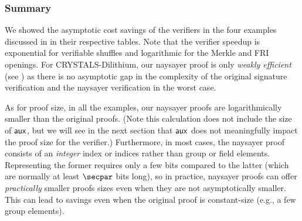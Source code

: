 \subsubsection{Summary}

% 

We showed the asymptotic cost savings of the verifiers in the four examples discussed in  in their respective tables. Note that the verifier speedup is exponential for verifiable shuffles and logarithmic for the Merkle and FRI openings. For CRYSTALS-Dilithium, our naysayer proof is only \emph{weakly efficient} (see ) as there is no asymptotic gap in the complexity of the original signature verification and the naysayer verification in the worst case.

As for proof size, in all the examples, our naysayer proofs are logarithmically smaller than the original proofs.
(Note this calculation does not include the size of $\mathsf{aux}$, but we will see in the next section that $\mathsf{aux}$ does not meaningfully impact the proof size for the verifier.)
Furthermore, in most cases, the naysayer proof consists of an \emph{integer} index or indices rather than group or field elements. Representing the former requires only a few bits compared to the latter (which are normally at least $\secpar$ bits long), so in practice, naysayer proofs can offer \emph{practically} smaller proofs sizes even when they are not asymptotically smaller. This can lead to savings even when the original proof is constant-size (e.g., a few group elements).